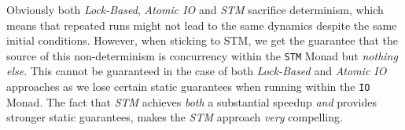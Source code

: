 Obviously both \textit{Lock-Based}, \textit{Atomic IO} and \textit{STM} sacrifice determinism, which means that repeated runs might not lead to the same dynamics despite the same initial conditions. However, when sticking to STM, we get the guarantee that the source of this non-determinism is concurrency within the \texttt{STM} Monad but \textit{nothing else}. This cannot be guaranteed in the case of both \textit{Lock-Based} and \textit{Atomic IO} approaches as we lose certain static guarantees when running within the \texttt{IO} Monad. The fact that \textit{STM} achieves \textit{both} a substantial speedup \textit{and} provides stronger static guarantees, makes the \textit{STM} approach \textit{very} compelling.